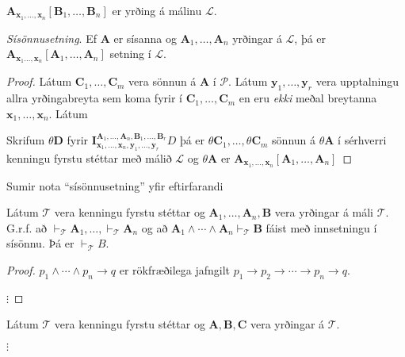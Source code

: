 \documentclass[12pt]{book}
\begin{document}
\begin{setn}
  $\mathbf{A}_{\mathbf{x}_1, \dotsc, \mathbf{x}_n}[\mathbf{B}_1, \dotsc, \mathbf{B}_n]$ er yrðing á málinu $\mathcal{L}$.

  \emph{Sísönnusetning}. Ef $\mathbf{A}$ er sísanna og $\mathbf{A}_1, \dotsc, \mathbf{A}_n$ yrðingar á $\mathcal{L}$, þá er
  $\mathbf{A}_{\mathbf{x}_1 \dotsc, \mathbf{x}_n}[\mathbf{A}_1, \dotsc, \mathbf{A}_n]$ setning
  í $\mathcal{L}$.

  \begin{proof}
    Látum $\mathbf{C}_1, \dotsc, \mathbf{C}_m$ vera sönnun á $\mathbf{A}$ í $\mathcal{P}$.
    Látum $\mathbf{y}_1, \dotsc, \mathbf{y}_r$ vera upptalningu allra yrðingabreyta sem
    koma fyrir í $\mathbf{C}_1, \dotsc, \mathbf{C}_m$ en eru \emph{ekki}
    meðal breytanna
    $\mathbf{x}_1, \dotsc, \mathbf{x}_n$. Látum

    Skrifum $\theta \mathbf{D}$ fyrir $\mathbf{I}^{\mathbf{A}_1, \dotsc, \mathbf{A}_n, \mathbf{B}_1, \dotsc, \mathbf{B}_r}_{\mathbf{x}_1, \dotsc, \mathbf{x}_n, \mathbf{y}_1, \dotsc, \mathbf{y}_r} D$
    þá er $\theta \mathbf{C}_1, \dotsc, \theta \mathbf{C}_m$ sönnun á $\theta \mathbf{A}$ í sérhverri kenningu
    fyrstu stéttar með málið $\mathcal{L}$ og $\theta \mathbf{A}$ er
    $\mathbf{A}_{\mathbf{x}_1, \dotsc, \mathbf{x}_n} [\mathbf{A}_1, \dotsc, \mathbf{A}_n]$
  \end{proof}
\end{setn}

Sumir nota ``sísönnusetning'' yfir eftirfarandi

\begin{setn}[Fylgisetning]
  Látum $\mathcal{T}$ vera kenningu fyrstu stéttar og $\mathbf{A}_1, \dotsc, \mathbf{A}_n, \mathbf{B}$ vera
yrðingar á máli $\mathcal{T}$. G.r.f. að
$\vdash_{\mathcal{T}} \mathbf{A}_1, \dotsc, \vdash_{\mathcal{T}} \mathbf{A}_n$
og að $\mathbf{A}_1 \wedge \dotsb \wedge \mathbf{A}_n \vdash_{\mathcal{T}} \mathbf{B}$
fáist með innsetningu í sísönnu. Þá er $\vdash_{\mathcal{T}}B$.

  \begin{proof}
   $p_1 \wedge \dotsb \wedge p_n \rightarrow q$
   er rökfræðilega jafngilt
   $p_1 \rightarrow p_2 \rightarrow \dotsb \rightarrow p_n \rightarrow q$.

   $\vdots$
  \end{proof}
\end{setn}


\begin{setn}[Fylgisetning]

  Látum $\mathcal{T}$ vera kenningu fyrstu stéttar og $\mathbf{A}, \mathbf{B}, \mathbf{C}$
  vera yrðingar á $\mathcal{T}$.

  $\vdots$
\end{setn}
\end{document}
